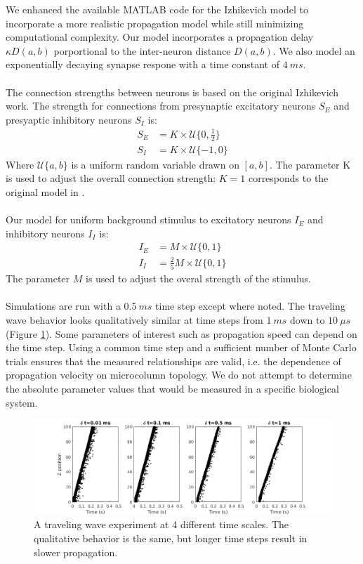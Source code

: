 \documentclass[a4paper,11pt]{article}
\begin{document}
We enhanced the available MATLAB code for the Izhikevich model to incorporate a more realistic propagation model while still minimizing computational complexity.
Our model incorporates a propagation delay $\kappa D(a,b)$ porportional to the inter-neuron distance $D(a,b)$. 
We also model an exponentially decaying synapse respone with a time constant of $4~ms$.
\\ \\
The connection strengths between neurons is based on the original Izhikevich work.
The strength for connections from presynaptic excitatory neurons $S_E$ and presyaptic inhibitory neurons $S_I$ is:
\begin{align}
 S_E &= K \times \mathcal{U}\{0,\frac{1}{2} \} \\
 S_I &= K \times \mathcal{U}\{-1,0 \} 
\end{align}
Where $\mathcal{U}\{a,b \}$ is a uniform random variable drawn on $[ a,b ] $.
The parameter K is used to adjust the overall connection strength: $K=1$ corresponds to the original model in \cite{izzy_code}. 
\\ \\
Our model for uniform background stimulus to excitatory neurons $I_E$ and inhibitory neurons $I_I$ is: 
\begin{align}
 I_E &= M \times \mathcal{U}\{0,1 \} \\
 I_I &= \frac{2}{5} M \times \mathcal{U}\{0,1 \}
\end{align}
The parameter $M$ is used to adjust the overal strength of the stimulus.
\\ \\
Simulations are run with a $0.5~ms$ time step except where noted.
The traveling wave behavior looks qualitatively similar at time steps from $1~ms$ down to $10~\mu s$ (Figure \ref{fig:time_step}).
Some parameters of interest such as propagation speed can depend on the time step.
Using a common time step and a sufficient number of Monte Carlo trials ensures that the measured relationships are valid, i.e. the dependence of propagation velocity on microcolumn topology.
We do not attempt to determine the absolute parameter values that would be measured in a specific biological system.
\begin{figure}[!htb]
 \centering
 \includegraphics[width=\textwidth]{fig/TimeStepEffect}
  \caption{A traveling wave experiment at 4 different time scales. The qualitative behavior is the same, but longer time steps result in slower propagation.}
 \label{fig:time_step}
\end{figure}
\end{document}
